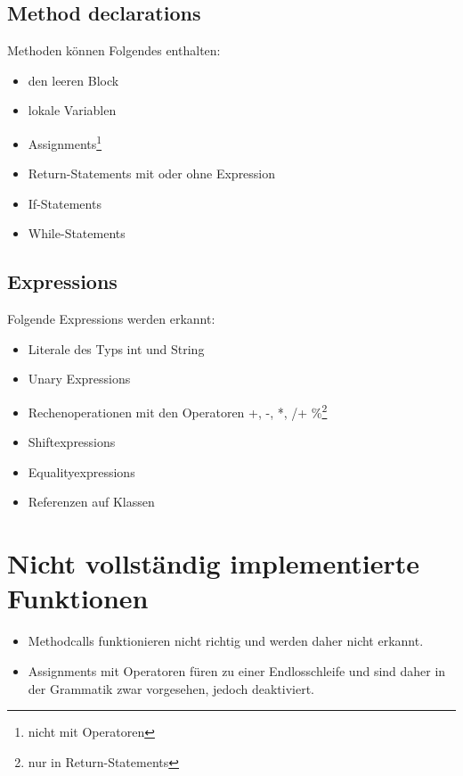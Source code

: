 \documentclass{scrartcl}
\begin{document}
\subsection{Method declarations}

Methoden können Folgendes enthalten:
\begin{itemize}
\item den leeren Block
\item lokale Variablen
\item Assignments\footnote{nicht mit Operatoren}
\item Return-Statements mit oder ohne Expression
\item If-Statements
\item While-Statements
\end{itemize}

\subsection{Expressions}

Folgende Expressions werden erkannt:
\begin{itemize}
\item Literale des Typs int und String
\item Unary Expressions
\item Rechenoperationen mit den Operatoren +, -, *, /+ \%\footnote{nur in Return-Statements}
\item Shiftexpressions
\item Equalityexpressions
\item Referenzen auf Klassen
\end{itemize}

\section{Nicht vollständig implementierte Funktionen}

\begin{itemize}
\item Methodcalls funktionieren nicht richtig und werden daher nicht erkannt.
\item Assignments mit Operatoren füren zu einer Endlosschleife und sind daher in der Grammatik zwar vorgesehen, jedoch deaktiviert.
\end{itemize}
\end{document}
